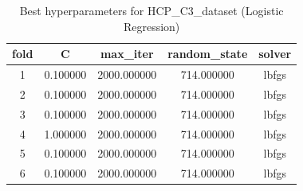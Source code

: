 \begin{table}[htbp]
\caption{Best hyperparameters for HCP_C3_dataset (Logistic Regression)}
\label{tab:best_hyperparams_HCP_C3_dataset}
\begin{tabular}{ccccc}
\toprule
fold & C & max_iter & random_state & solver \\
\midrule
1 & 0.100000 & 2000.000000 & 714.000000 & lbfgs \\
2 & 0.100000 & 2000.000000 & 714.000000 & lbfgs \\
3 & 0.100000 & 2000.000000 & 714.000000 & lbfgs \\
4 & 1.000000 & 2000.000000 & 714.000000 & lbfgs \\
5 & 0.100000 & 2000.000000 & 714.000000 & lbfgs \\
6 & 0.100000 & 2000.000000 & 714.000000 & lbfgs \\
\bottomrule
\end{tabular}
\end{table}
